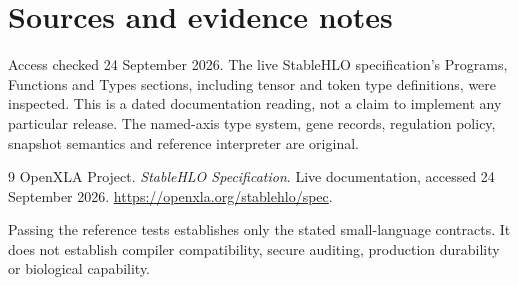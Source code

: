\chapter*{Sources and evidence notes}
Access checked 24 September 2026. The live StableHLO specification's Programs,
Functions and Types sections, including tensor and token type definitions,
were inspected. This is a dated documentation reading, not a claim to
implement any particular release. The named-axis type system, gene records,
regulation policy, snapshot semantics and reference interpreter are original.
\begingroup\let\chapter\section
\begin{thebibliography}{9}
 OpenXLA Project.
\emph{StableHLO Specification}. Live documentation, accessed 24 September 2026.
\url{https://openxla.org/stablehlo/spec}.
\end{thebibliography}
\endgroup
Passing the reference tests establishes only the stated small-language
contracts. It does not establish compiler compatibility, secure auditing,
production durability or biological capability.

